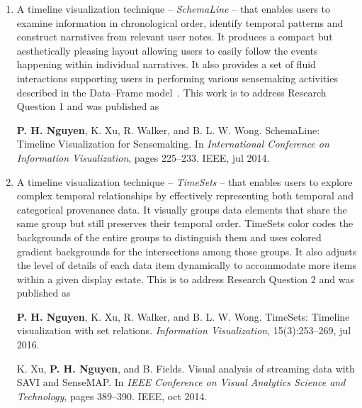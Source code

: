 \begin{enumerate}
	\item A timeline visualization technique -- \emph{SchemaLine} -- that enables users to examine information in chronological order, identify temporal patterns and construct narratives from relevant user notes. It produces a compact but aesthetically pleasing layout allowing users to easily follow the events happening within individual narratives. It also provides a set of fluid interactions supporting users in performing various sensemaking activities described in the Data--Frame model~\cite{Klein2003}. This work is to address Research Question 1 and was published as

	\qquad\textbf{P. H. Nguyen}, K. Xu, R. Walker, and B. L. W. Wong. SchemaLine: Timeline Visualization for Sensemaking. In \textit{International Conference on Information Visualization}, pages 225--233. IEEE, jul 2014.

	\item A timeline visualization technique -- \emph{TimeSets} -- that enables users to explore complex temporal relationships by effectively representing both temporal and categorical provenance data. It visually groups data elements that share the same group but still preserves their temporal order. TimeSets color codes the backgrounds of the entire groups to distinguish them and uses colored gradient backgrounds for the intersections among those groups. It also adjusts the level of details of each data item dynamically to accommodate more items within a given display estate. This is to address Research Question 2 and was published as

	\qquad\textbf{P. H. Nguyen}, K. Xu, R. Walker, and B. L. W. Wong. TimeSets: Timeline visualization with set relations. \textit{Information Visualization}, 15(3):253--269, jul 2016.

	\qquad K. Xu, \textbf{P. H. Nguyen}, and B. Fields. Visual analysis of streaming data with SAVI and SenseMAP. In \textit{IEEE Conference on Visual Analytics Science and Technology}, pages 389--390. IEEE, oct 2014.


\end{enumerate}
